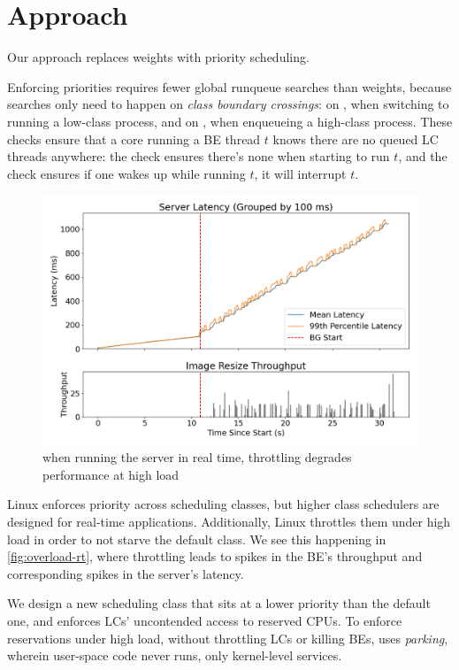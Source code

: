 \section{Approach}

Our approach replaces weights with priority scheduling.

Enforcing priorities requires fewer global runqueue searches than weights,
because searches only need to happen on \textit{class boundary crossings}: on
\exit{}, when switching to running a low-class process, and on \entry{}, when
enqueueing a high-class process. These checks ensure that a core running a BE
thread $t$ knows there are no queued LC threads anywhere: the \exit{} check
ensures there's none when starting to run $t$, and the \entry{} check ensures if
one wakes up while running $t$, it will interrupt $t$.

\begin{figure}[t]
    \centering
    \includegraphics[width=\columnwidth]{graphs/overload-rt.png}
    \caption{when running the server in real time, throttling degrades
    performance at high load}\label{fig:overload-rt}
\end{figure}


Linux enforces priority across scheduling classes, but higher class schedulers
are designed for real-time applications. Additionally, Linux throttles them
under high load in order to not starve the default class. We see this
happening in \autoref{fig:overload-rt}, where throttling leads to spikes in the
BE's throughput and corresponding spikes in the server's latency.

We design a new scheduling class \beclass{} that sits at a lower priority than
the default one, and enforces LCs' uncontended access to reserved CPUs. To
enforce reservations under high load, without throttling LCs or killing BEs,
\beclass{} uses \textit{parking}, wherein user-space code never runs, only
kernel-level services.
